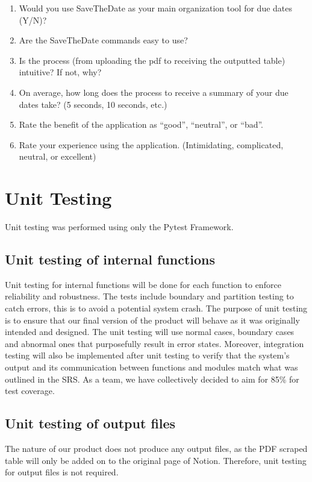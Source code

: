 \documentclass[12pt, titlepage]{article}
\begin{document}
\begin{enumerate}

\item Would you use SaveTheDate as your main organization tool for due dates (Y/N)? 

\item Are the SaveTheDate commands easy to use? 

\item Is the process (from uploading the pdf to receiving the outputted table) intuitive? If not, why? 

\item On average, how long does the process to receive a summary of your due dates take? (5 seconds, 10 seconds, etc.) 

\item Rate the benefit of the application as “good”, “neutral”, or “bad”.  

\item Rate your experience using the application. (Intimidating, complicated, neutral, or excellent) 

\end{enumerate}

\section{Unit Testing}

Unit testing was performed using only the Pytest Framework.

\subsection{Unit testing of internal functions}
Unit testing for internal functions will be done for each function to enforce reliability and robustness. The tests include boundary and partition testing to catch errors, this is to avoid a potential system crash.  The purpose of unit testing is to ensure that our final version of the product will behave as it was originally intended and designed. The unit testing will use normal cases, boundary cases and abnormal ones that purposefully result in error states. Moreover, integration testing will also be implemented after unit testing to verify that the system’s output and its communication between functions and modules match what was outlined in the SRS. As a team, we have collectively decided to aim for 85\% for test coverage. 

\subsection{Unit testing of output files}	
The nature of our product does not produce any output files, as the PDF scraped table will only be added on to the original page of Notion. Therefore, unit testing for output files is not required. 
\end{document}
